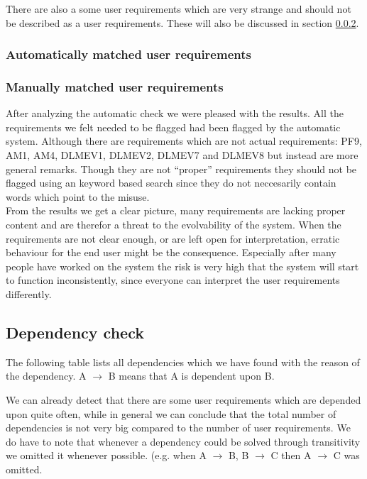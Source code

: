 \documentclass[a4paper,twoside,11pt]{article}
\begin{document}
There are also a some user requirements which are very strange and should not be described as a user requirements. These will also be discussed in section \ref{manual_match}.

\subsubsection{Automatically matched user requirements}
\label{auto_match}


\subsubsection{Manually matched user requirements}
\label{manual_match}
After analyzing the automatic check we were pleased with the results. All the requirements we felt needed to be flagged had been flagged by the automatic system. Although there are requirements which are not actual requirements: {\sc PF9, AM1, AM4, DLMEV1, DLMEV2, DLMEV7} and  {\sc DLMEV8} but instead are more general remarks. Though they are not ``proper'' requirements they should not be flagged using an keyword based search since they do not neccesarily contain words which point to the misuse. \\

From the results we get a clear picture, many requirements are lacking proper content and are therefor a threat to the evolvability of the system. When the requirements are not clear enough, or are left open for interpretation, erratic behaviour for the end user might be the consequence. Especially after many people have worked on the system the risk is very high that the system will start to function inconsistently, since everyone can interpret the user requirements differently.

\subsection{Dependency check}
The following table lists all dependencies which we have found with the reason of the dependency. {\sc A $\rightarrow$ B} means that {\sc A} is dependent upon {\sc B}.



We can already detect that there are some user requirements which are depended upon quite often, while in general we can conclude that the total number of dependencies is not very big compared to the number of user requirements. We do have to note that whenever a dependency could be solved through transitivity we omitted it whenever possible. (e.g. when {\sc A $\rightarrow$ B, B $\rightarrow$ C} then {\sc A $\rightarrow$ C} was omitted. \\
\end{document}
